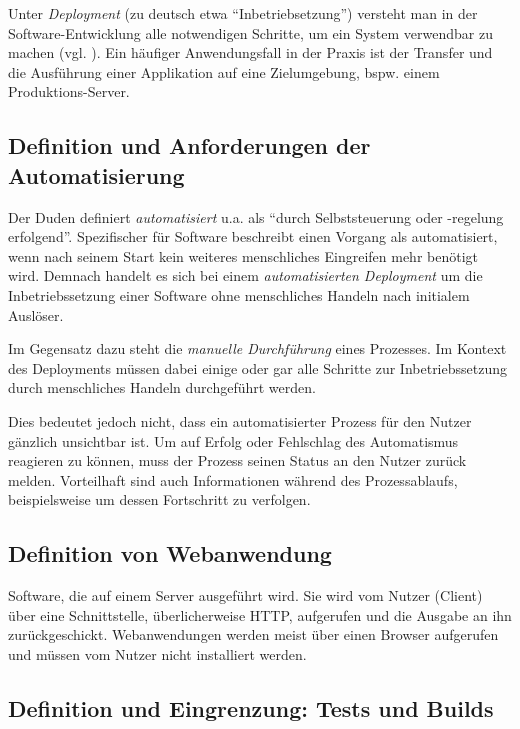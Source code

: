 Unter \emph{Deployment} (zu deutsch etwa ``Inbetriebsetzung'') versteht man in der Software-Entwicklung alle notwendigen Schritte, um ein System verwendbar zu machen (vgl. \citep[21]{Breuer2009}). Ein häufiger Anwendungsfall in der Praxis ist der Transfer und die Ausführung einer Applikation auf eine Zielumgebung, bspw. einem Produktions-Server.

\subsection{Definition und Anforderungen der Automatisierung}

Der Duden \citeyearpar{Duden} definiert \emph{automatisiert} u.a. als ``durch Selbststeuerung oder -regelung erfolgend''. Spezifischer für Software beschreibt \citet[27]{Duvall2007} einen Vorgang als automatisiert, wenn nach seinem Start kein weiteres menschliches Eingreifen mehr benötigt wird. Demnach handelt es sich bei einem \emph{automatisierten Deployment} um die Inbetriebssetzung einer Software ohne menschliches Handeln nach initialem Auslöser.

Im Gegensatz dazu steht die \emph{manuelle Durchführung} eines Prozesses. Im Kontext des Deployments müssen dabei einige oder gar alle Schritte zur Inbetriebssetzung durch menschliches Handeln durchgeführt werden.


Dies bedeutet jedoch nicht, dass ein automatisierter Prozess für den Nutzer gänzlich unsichtbar ist. Um auf Erfolg oder Fehlschlag des Automatismus reagieren zu können, muss der Prozess seinen Status an den Nutzer zurück melden. Vorteilhaft sind auch Informationen während des Prozessablaufs, beispielsweise um dessen Fortschritt zu verfolgen. \citep[10f]{Duvall2007}

\subsection{Definition von Webanwendung}

Software, die auf einem Server ausgeführt wird. Sie wird vom Nutzer (Client) über eine Schnittstelle, überlicherweise \ac{HTTP}, aufgerufen und die Ausgabe an ihn zurückgeschickt. Webanwendungen werden meist über einen Browser aufgerufen und müssen vom Nutzer nicht installiert werden.


\subsection{Definition und Eingrenzung: Tests und Builds}

